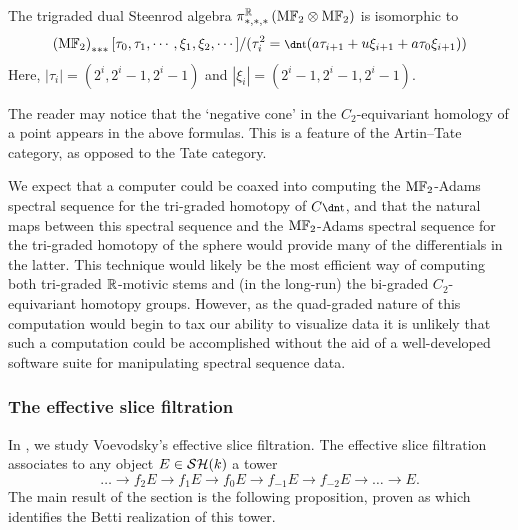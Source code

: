 \begin{prop} 
The trigraded dual Steenrod algebra $\pi^{\mathbb{R}}_{*,*,*} \left(\mathrm{M}\mathbb{F}_2 \otimes \mathrm{M}\mathbb{F}_2\right)$ is isomorphic to
$$\left(\HFt\right)_{***} [\tau_0,\tau_1,\cdots,\xi_1,\xi_2,\cdots]/(\tau_i^2 = \ta (a \tau_{i+1} + u \xi_{i+1} + a \tau_0 \xi_{i+1}))$$
Here, $|\tau_i|=(2^i,2^{i}-1,2^{i}-1)$ and $|\xi_{i}|=(2^i-1,2^i-1,2^i-1)$.
\end{prop}

\begin{rmk}
The reader may notice that the `negative cone' in the $C_2$-equivariant homology of a point appears in the above formulas.  This is a feature of the Artin--Tate category, as opposed to the Tate category.
\end{rmk}

We expect that a computer could be coaxed into computing the $\mathrm{M}\mathbb{F}_2$-Adams spectral sequence for the tri-graded homotopy of $C\ta$, and that the natural maps between this spectral sequence and the $\mathrm{M}\mathbb{F}_2$-Adams spectral sequence for the tri-graded homotopy of the sphere would provide many of the differentials in the latter. This technique would likely be the most efficient way of computing both tri-graded $\mathbb{R}$-motivic stems and (in the long-run) the bi-graded $C_2$-equivariant homotopy groups. However, as the quad-graded nature of this computation would begin to tax our ability to visualize data it is unlikely that such a computation could be accomplished without the aid of a well-developed software suite for manipulating spectral sequence data.

%
%

\subsubsection{The effective slice filtration}
In , we study Voevodsky's effective slice filtration. 
The effective slice filtration associates to any object $E \in \mathcal{SH}(k)$ a tower
\[ \dots \to f_{2} E \to f_1 E \to f_0 E \to f_{-1} E \to f_{-2} E \to \dots \to E.\]
The main result of the section is the following proposition, proven as  which identifies the Betti realization of this tower.

